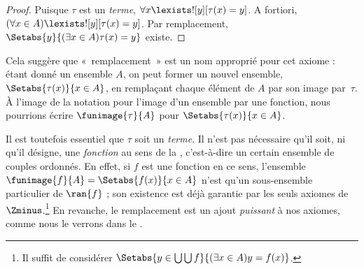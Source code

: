 \documentclass[../../../include/open-logic-section]{subfiles}
\begin{document}
\begin{proof}
Puisque $\tau$ est un \emph{terme},
$\forall x \lexists![y][\tau(x) = y]$. A fortiori,
$(\forall x \in A)\lexists![y][\tau(x) = y]$. Par remplacement,
$\Setabs{y}{(\exists x \in A)\tau(x) = y}$ existe.
\end{proof}
\noindent
Cela suggère que «~remplacement~» est un nom approprié pour cet
axiome : étant donné un ensemble $A$, on peut former un nouvel
ensemble, $\Setabs{\tau(x)}{x \in A}$, en remplaçant chaque élément
de $A$ par son image par~$\tau$. À l'image de la notation pour
l'image d'un ensemble par une fonction, nous pourrions écrire
$\funimage{\tau}{A}$ pour $\Setabs{\tau(x)}{x \in A}$.

Il est toutefois essentiel que $\tau$ soit un \emph{terme}. Il
n'est pas nécessaire qu'il soit, ni qu'il désigne, une
\emph{fonction} au sens de la , c'est-à-dire
un certain ensemble de couples ordonnés. En effet, si $f$ est une
fonction en ce sens, l'ensemble
$\funimage{f}{A} = \Setabs{f(x)}{x \in A}$ n'est qu'un sous-ensemble
particulier de $\ran{f}$ ; son existence est déjà garantie par les
seuls axiomes de~$\Zminus$.\footnote{Il suffit de considérer
$\Setabs{y \in \bigcup \bigcup f}{(\exists x \in A)y = f(x)}$.}
En revanche, le remplacement est un ajout \emph{puissant} à nos
axiomes, comme nous le verrons dans le
.
\end{document}
